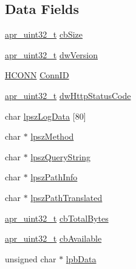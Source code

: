 \subsection*{Data Fields}
\begin{DoxyCompactItemize}
\item 
\hyperlink{group__apr__platform_ga558548a135d8a816c4787250744ea147}{apr\+\_\+uint32\+\_\+t} \hyperlink{structEXTENSION__CONTROL__BLOCK_abf0c86c0d9efcfea35c48e50019b8fc3}{cb\+Size}
\item 
\hyperlink{group__apr__platform_ga558548a135d8a816c4787250744ea147}{apr\+\_\+uint32\+\_\+t} \hyperlink{structEXTENSION__CONTROL__BLOCK_a04f981083ab9048af6597c78123c8156}{dw\+Version}
\item 
\hyperlink{group__MOD__ISAPI_ga3fd355d88d70287fd8783d066d69214e}{H\+C\+O\+NN} \hyperlink{structEXTENSION__CONTROL__BLOCK_a4f353983cbeb84d4a21f1d0a1faf4ce5}{Conn\+ID}
\item 
\hyperlink{group__apr__platform_ga558548a135d8a816c4787250744ea147}{apr\+\_\+uint32\+\_\+t} \hyperlink{structEXTENSION__CONTROL__BLOCK_a9bbb3fbf59edbe219c95787d5750d6f5}{dw\+Http\+Status\+Code}
\item 
char \hyperlink{structEXTENSION__CONTROL__BLOCK_aa13e576d542decae9ed65ff1f5985d37}{lpsz\+Log\+Data} \mbox{[}80\mbox{]}
\item 
char $\ast$ \hyperlink{structEXTENSION__CONTROL__BLOCK_ae94143cd45b7931a4f53b9df696bffa4}{lpsz\+Method}
\item 
char $\ast$ \hyperlink{structEXTENSION__CONTROL__BLOCK_abd7c3e0977f54413a1e330d2175484f8}{lpsz\+Query\+String}
\item 
char $\ast$ \hyperlink{structEXTENSION__CONTROL__BLOCK_a36d9cf24052bc53b28695f099e0841e8}{lpsz\+Path\+Info}
\item 
char $\ast$ \hyperlink{structEXTENSION__CONTROL__BLOCK_a7f5151eba00ee44ddb9e9c7af1a431e4}{lpsz\+Path\+Translated}
\item 
\hyperlink{group__apr__platform_ga558548a135d8a816c4787250744ea147}{apr\+\_\+uint32\+\_\+t} \hyperlink{structEXTENSION__CONTROL__BLOCK_a61a2248d00e7c4a9d27bbcce9a2bd412}{cb\+Total\+Bytes}
\item 
\hyperlink{group__apr__platform_ga558548a135d8a816c4787250744ea147}{apr\+\_\+uint32\+\_\+t} \hyperlink{structEXTENSION__CONTROL__BLOCK_a778710ce20c2082daa4c5421adac3a6b}{cb\+Available}
\item 
unsigned char $\ast$ \hyperlink{structEXTENSION__CONTROL__BLOCK_a1760a5ed8e320820b3a42a0afb3d8185}{lpb\+Data}
\item 

\end{DoxyCompactItemize}

